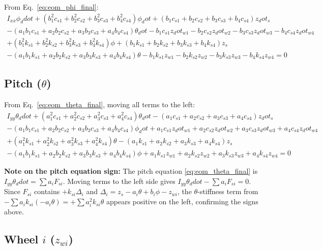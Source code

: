 \documentclass[11pt]{article}
\def\ddot#1{#1_ddot}%
\def\dot#1{#1_dot}%
\begin{document}
From Eq.~\eqref{eq:eom_phi_final}:
\begin{multline}
I_{xx}\ddot\phi + (b_1^2 c_{s1}+b_2^2 c_{s2}+b_3^2 c_{s3}+b_4^2 c_{s4})\dot\phi + (b_1 c_{s1}+b_2 c_{s2}+b_3 c_{s3}+b_4 c_{s4})\dot{z}_s \\
 - (a_1 b_1 c_{s1}+a_2 b_2 c_{s2}+a_3 b_3 c_{s3}+a_4 b_4 c_{s4})\dot\theta - b_1 c_{s1}\dot{z}_{w1} - b_2 c_{s2}\dot{z}_{w2} - b_3 c_{s3}\dot{z}_{w3} - b_4 c_{s4}\dot{z}_{w4} \\
+ (b_1^2 k_{s1}+b_2^2 k_{s2}+b_3^2 k_{s3}+b_4^2 k_{s4})\phi + (b_1 k_{s1}+b_2 k_{s2}+b_3 k_{s3}+b_4 k_{s4})z_s \\
 - (a_1 b_1 k_{s1}+a_2 b_2 k_{s2}+a_3 b_3 k_{s3}+a_4 b_4 k_{s4})\theta - b_1 k_{s1}z_{w1} - b_2 k_{s2}z_{w2} - b_3 k_{s3}z_{w3} - b_4 k_{s4}z_{w4} = 0
\label{eq:roll_full}
\end{multline}

\subsection{Pitch ($\theta$)}

From Eq.~\eqref{eq:eom_theta_final}, moving all terms to the left:
\begin{multline}
I_{yy}\ddot\theta + (a_1^2 c_{s1}+a_2^2 c_{s2}+a_3^2 c_{s3}+a_4^2 c_{s4})\dot\theta - (a_1 c_{s1}+a_2 c_{s2}+a_3 c_{s3}+a_4 c_{s4})\dot{z}_s \\
 - (a_1 b_1 c_{s1}+a_2 b_2 c_{s2}+a_3 b_3 c_{s3}+a_4 b_4 c_{s4})\dot\phi + a_1 c_{s1}\dot{z}_{w1} + a_2 c_{s2}\dot{z}_{w2} + a_3 c_{s3}\dot{z}_{w3} + a_4 c_{s4}\dot{z}_{w4} \\
+ (a_1^2 k_{s1}+a_2^2 k_{s2}+a_3^2 k_{s3}+a_4^2 k_{s4})\theta - (a_1 k_{s1}+a_2 k_{s2}+a_3 k_{s3}+a_4 k_{s4})z_s \\
 - (a_1 b_1 k_{s1}+a_2 b_2 k_{s2}+a_3 b_3 k_{s3}+a_4 b_4 k_{s4})\phi + a_1 k_{s1}z_{w1} + a_2 k_{s2}z_{w2} + a_3 k_{s3}z_{w3} + a_4 k_{s4}z_{w4} = 0
\label{eq:pitch_full}
\end{multline}

\textbf{Note on the pitch equation sign:} The pitch equation \eqref{eq:eom_theta_final} is $I_{yy}\ddot\theta = \sum a_i F_{si}$. Moving terms to the left side gives $I_{yy}\ddot\theta - \sum a_i F_{si} = 0$. Since $F_{si}$ contains $+k_{si}\Delta_i$ and $\Delta_i = z_s - a_i\theta + b_i\phi - z_{wi}$, the $\theta$-stiffness term from $-\sum a_i k_{si}(-a_i\theta) = +\sum a_i^2 k_{si}\theta$ appears positive on the left, confirming the signs above.

\subsection{Wheel $i$ ($z_{wi}$)}
\end{document}
